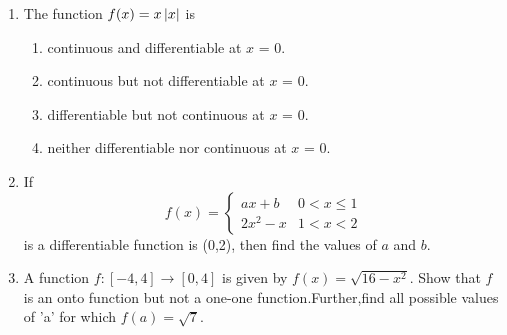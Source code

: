 %
\begin{enumerate}
	\item The function $f(x) = x \left\vert x\right\vert $ is
        \begin{enumerate}
            \item continuous and differentiable at $x$ = 0.
            \item continuous but not differentiable at $x$ = 0.
            \item differentiable but not continuous at $x$ = 0.
            \item neither differentiable nor continuous at $x$ = 0.
        \end{enumerate}
	 \item If
 	\begin{equation}
    	f(x) =  
    	\begin{cases}
            ax+b & 0<x \le 1 \\
            2x^2-x & 1<x<2
    	\end{cases}
 	\end{equation}
  	is a differentiable function is (0,2), then find the values of $a$ and $b$.
 	\item A function $ f: [-4,4] \rightarrow [0,4] $ is given by $ f(x) = \sqrt{16-x^2}$. Show that $f$ is an onto function but not a one-one                    function.Further,find all possible values of 'a' for which $ f(a) = \sqrt{7}.$
\end{enumerate}
%
